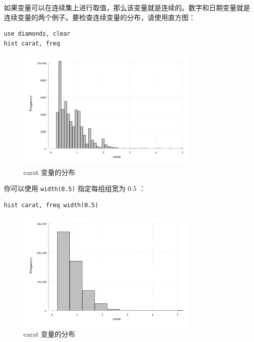 \documentclass[]{ctexbook}
\begin{document}
如果变量可以在连续集上进行取值，那么该变量就是连续的。数字和日期变量就是连续变量的两个例子。要检查连续变量的分布，请使用直方图：

\begin{lstlisting}
use diamonds, clear
hist carat, freq
\end{lstlisting}

\begin{figure}

{\centering \includegraphics[width=0.8\textwidth]{assets/histcarat} 

}

\caption{carat 变量的分布}\label{fig:histcarat}
\end{figure}

你可以使用 \texttt{width(0.5)} 指定每组组宽为 0.5 ：

\begin{lstlisting}
hist carat, freq width(0.5)
\end{lstlisting}

\begin{figure}

{\centering \includegraphics[width=0.8\textwidth]{assets/histcarat2} 

}

\caption{carat 变量的分布}\label{fig:histcarat2}
\end{figure}
\end{document}
